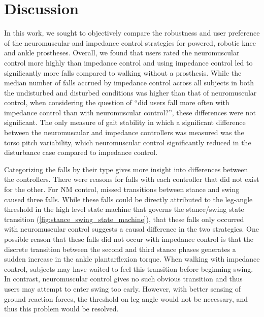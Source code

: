 \section{Discussion}

In this work, we sought to objectively compare the robustness and user
preference of the neuromuscular and impedance control strategies for powered,
robotic knee and ankle prostheses. Overall, we found that users rated the
neuromuscular control more highly than impedance control and using impedance
control led to significantly more falls compared to walking without a
prosthesis. While the median number of falls accrued by impedance control across
all subjects in both the undisturbed and disturbed conditions was higher than
that of neuromuscular control, when considering the question of ``did users fall
more often with impedance control than with neuromuscular control?'', these
differences were not significant. The only measure of gait stability in which a
significant difference between the neuromuscular and impedance controllers was
measured was the torso pitch variability, which neuromuscular control
significantly reduced in the disturbance case compared to impedance control.

Categorizing the falls by their type gives more insight into differences between
the controllers. There were reasons for falls with each controller that did not
exist for the other. For NM control, missed transitions between stance and swing
caused three falls. While these falls could be directly attributed to the
leg-angle threshold in the high level state machine that governs the
stance/swing state transition (\cref{fig:stance_swing_state_machine}), that
these falls only occurred with neuromuscular control suggests a causal
difference in the two strategies. One possible reason that these falls did not
occur with impedance control is that the discrete transition between the second
and third stance phases generates a sudden increase in the ankle plantarflexion
torque. When walking with impedance control, subjects may have waited to feel
this transition before beginning swing. In contrast, neuromuscular control gives
no such obvious transition and thus users may attempt to enter swing too early.
However, with better sensing of ground reaction forces, the threshold on leg
angle would not be necessary, and thus this problem would be resolved.


